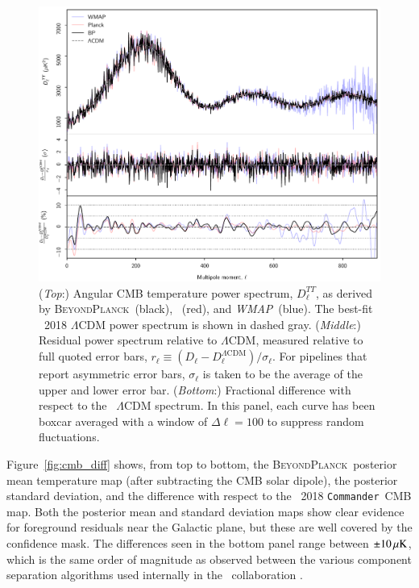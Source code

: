 \documentclass[twocolumn]{aa}
\def\WMAP{\emph{WMAP}}
\def\commander{\texttt{Commander}}
\newcommand{\BP}{\textsc{BeyondPlanck}}
\begin{document}
\begin{figure}[t]
  \center
  \includegraphics[width=\linewidth]{figs/cl_TT_BP10_v2.pdf}
  \caption{(\emph{Top}:) Angular CMB temperature power spectrum,
    $D_{\ell}^{TT}$, as derived by \BP\ (black), \Planck\ (red), and
    \WMAP\ (blue). The best-fit \Planck\ 2018 $\Lambda$CDM power
    spectrum is shown in dashed gray. (\emph{Middle}:) Residual power
    spectrum relative to $\Lambda$CDM, measured relative to full
    quoted error bars, $r_{\ell} \equiv
    (D_{\ell}-D_{\ell}^{\Lambda\mathrm{CDM}})/\sigma_{\ell}$. For
    pipelines that report asymmetric error bars, $\sigma_{\ell}$ is
    taken to be the average of the upper and lower error
    bar. (\emph{Bottom}:) Fractional difference with respect to the
    \Planck\ $\Lambda$CDM spectrum. In this panel, each curve has been
    boxcar averaged with a window of $\Delta\ell=100$ to suppress
    random fluctuations. }\label{fig:cl_TT}
\end{figure}



Figure~\ref{fig:cmb_diff} shows, from top to bottom, the \BP\ posterior
mean temperature map (after subtracting the CMB solar dipole), the
posterior standard deviation, and the difference with respect to the
\Planck\ 2018 \commander\ CMB map. Both the posterior mean and
standard deviation maps show clear evidence for foreground residuals
near the Galactic plane, but these are well covered by the confidence
mask. The differences seen in the bottom panel range between
$\pm10\muK$, which is the same order of magnitude as observed between
the various component separation algorithms used internally in the
\Planck\ collaboration \citep{planck2016-l04}. 
\end{document}
